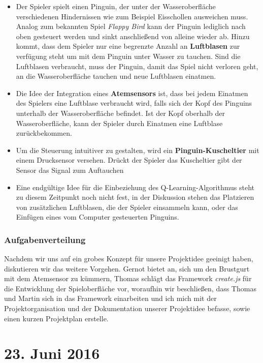 \documentclass{report}
\begin{document}
\begin{itemize}
	\item Der Spieler spielt einen Pinguin, der unter der Wasseroberfläche verschiedenen Hindernissen wie zum Beispiel Eisschollen ausweichen muss. Analog zum bekannten Spiel \textit{Flappy Bird} kann der Pinguin lediglich nach oben gesteuert werden und sinkt anschließend von alleine wieder ab. Hinzu kommt, dass dem Spieler nur eine begrenzte Anzahl an \textbf{Luftblasen} zur verfügung steht um mit dem Pinguin unter Wasser zu tauchen. Sind die Luftblasen verbraucht, muss der Pinguin, damit das Spiel nicht verloren geht, an die Wasseroberfläche tauchen und neue Luftblasen einatmen.
	\item Die Idee der Integration eines \textbf{Atemsensors} ist, dass bei jedem Einatmen des Spielers eine Luftblase verbraucht wird, falls sich der Kopf des Pinguins unterhalb der Wasseroberfläche befindet. Ist der Kopf oberhalb der Wasseroberfläche, kann der Spieler durch Einatmen eine Luftblase zurückbekommen.  
	\item Um die Steuerung intuitiver zu gestalten, wird ein \textbf{Pinguin-Kuscheltier} mit einem Drucksensor versehen. Drückt der Spieler das Kuscheltier gibt der Sensor das Signal zum Auftauchen
	\item Eine endgültige Idee für die Einbeziehung des Q-Learning-Algorithmus steht zu diesem Zeitpunkt noch nicht fest, in der Diskussion stehen das Platzieren von zusätzlichen Luftblasen, die der Spieler einsammeln kann, oder das Einfügen eines vom Computer gesteuerten Pinguins. 
\end{itemize}


\subsubsection*{Aufgabenverteilung}

Nachdem wir uns auf ein grobes Konzept für unsere Projektidee geeinigt haben, diskutieren wir das weitere Vorgehen. Gernot bietet an, sich um den Brustgurt mit dem Atemsensor zu kümmern, Thomas schlägt das Framework \textit{create.js} für die Entwicklung der Spieloberfläche vor, woraufhin wir beschließen, dass Thomas und Martin sich in das Framework einarbeiten und ich mich mit der Projektorganisation und der Dokumentation unserer Projektidee befasse, sowie einen kurzen Projektplan erstelle.


\section*{23. Juni 2016}
\end{document}
